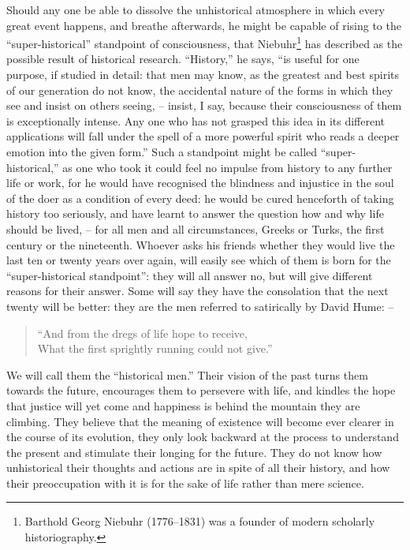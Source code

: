 Should any one be able to dissolve the unhistorical atmosphere in
which every great event happens, and breathe afterwards, he might be
capable of rising to the \enquote{super-historical} standpoint of
consciousness, that Niebuhr\footnote{Barthold Georg Niebuhr (1776–1831) was a founder of modern scholarly historiography.} has described as the possible result of
historical research. \enquote{History,} he says, \enquote{is useful for one purpose,
if studied in detail: that men may know, as the greatest and best
spirits of our generation do not know, the accidental nature of the
forms in which they see and insist on others seeing, -- insist, I say,
because their consciousness of them is exceptionally intense. Any one
who has not grasped this idea in its different applications will fall
under the spell of a more powerful spirit who reads a deeper emotion
into the given form.} Such a standpoint might be called
\enquote{super-historical,} as one who took it could feel no impulse from
history to any further life or work, for he would have recognised the
blindness and injustice in the soul of the doer as a condition of
every deed: he would be cured henceforth of taking history too
seriously, and have learnt to answer the question how and why life
should be lived, -- for all men and all circumstances, Greeks or Turks,
the first century or the nineteenth. Whoever asks his friends whether
they would live the last ten or twenty years over again, will easily
see which of them is born for the \enquote{super-historical standpoint}: they
will all answer no, but will give different reasons for their answer.
Some will say they have the consolation that the next twenty will be
better: they are the men referred to satirically by David Hume: -- 

\begin{quote}
  \enquote{And from the dregs of life hope to receive,\\
  What the first sprightly running could not give.}
\end{quote}

\noindent
We will call them the \enquote{historical men.} Their vision of the past
turns them towards the future, encourages them to persevere with
life, and kindles the hope that justice will yet come and happiness
is behind the mountain they are climbing. They believe that the
meaning of existence will become ever clearer in the course of its
evolution, they only look backward at the process to understand the
present and stimulate their longing for the future. They do not know
how unhistorical their thoughts and actions are in spite of all their
history, and how their preoccupation with it is for the sake of life
rather than mere science.

